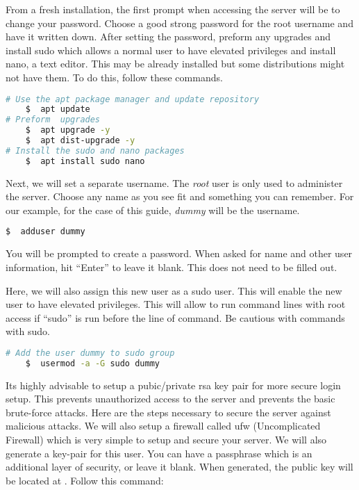 From a fresh installation, the first prompt when accessing the server will be to change your password. Choose a good strong password for the root username and have it written down.  After setting the password, preform any upgrades and install sudo which allows a normal user to have elevated privileges and install nano, a text editor. This may be already installed but some distributions might not have them. To do this, follow these commands.

\begin{lstlisting}[language=bash]
# Use the apt package manager and update repository
	$  apt update            
# Preform  upgrades
	$  apt upgrade -y        
	$  apt dist-upgrade -y   
# Install the sudo and nano packages
	$  apt install sudo nano 
\end{lstlisting}

Next, we will set a separate username. The \emph{root} user is only used to administer the server.  Choose any name as you see fit and something you can remember. For our example, for the case of this guide, \emph{dummy} will be the username.

\begin{lstlisting}[language=bash]
	$  adduser dummy
\end{lstlisting}

You will be prompted to create a password. When asked for name and other user information, hit ``Enter'' to leave it blank. This does not need to be filled out.

Here, we will also assign this new user as a sudo user. This will enable the new user to have elevated privileges. This will allow to run command lines with root access if ``sudo'' is run before the line of command. Be cautious with commands with sudo.

\begin{lstlisting}[language=bash]
# Add the user dummy to sudo group
	$  usermod -a -G sudo dummy 
\end{lstlisting}

Its highly advisable to setup a pubic/private \gls{rsa} key pair for more secure login setup. This prevents unauthorized access to the server and prevents the basic brute-force attacks. Here are the steps necessary to secure the server against malicious attacks. We will also setup a firewall called ufw (Uncomplicated Firewall) which is very simple to setup and secure your server. We will also generate a key-pair for this user. You can have a passphrase which is an additional layer of security, or leave it blank. When generated, the public key will be located at . Follow this command:

